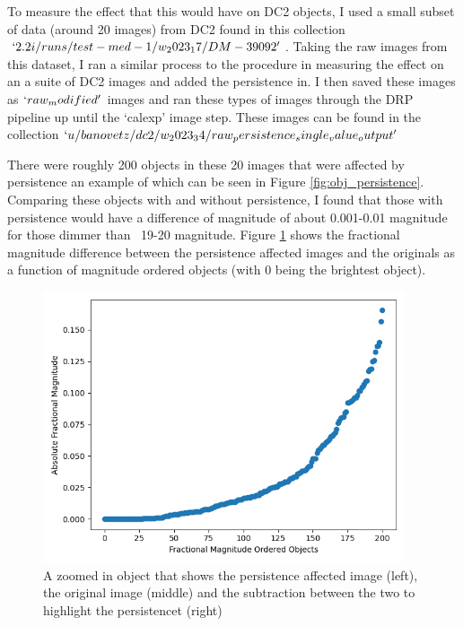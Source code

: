 \documentclass[DM,authoryear,toc]{lsstdoc}
\begin{document}
To measure the effect that this would have on DC2 objects, I used a small subset of data (around 20 images) from DC2 
found in this collection \texttt{$`2.2i/runs/test-med-1/w_2023_17/DM-39092'$}. 
Taking the raw images from this dataset, 
I ran a similar process to the procedure in measuring the effect on an a suite of DC2 images and added the persistence in. 
I then saved these images as \texttt{$`raw_modified'$} images and ran these types of images through the DRP pipeline up until the `calexp' image step.
These images can be found in the collection \texttt{$`u/banovetz/dc2/w_2023_34/raw_persistence_single_value_output'$}

There were roughly 200 objects in these 20 images that were affected by persistence an example of which can be seen in Figure \ref{fig:obj_persistence}.
Comparing these objects with and without persistence, 
I found that those with persistence would have a difference of magnitude of about 0.001-0.01 magnitude for those dimmer than ~19-20 magnitude. 
Figure \ref{fig:absolute_fractional_flux} shows the fractional magnitude difference between the persistence affected images and the originals
 as a function of magnitude ordered objects (with 0 being the brightest object).

\begin{figure}[!htp]
  \centering
  \includegraphics[width=0.95\textwidth, angle=0]{Absolute_Fractional_Magnitude.png}
  \caption{
  A zoomed in object that shows the persistence affected image (left), the original image (middle) 
  and the subtraction between the two to highlight the persistencet (right)
  }\label{fig:absolute_fractional_flux}
\end{figure}
\end{document}
